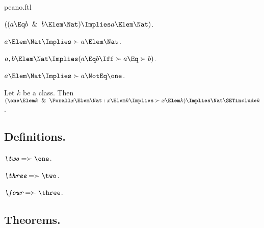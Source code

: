 \documentclass{stex}
\begin{document}
\begin{smodule}{peano.ftl}
\begin{forthel}
  \begin{axiom*}[title=5,name=P5]
    $((a \Eq b \And b \Elem \Nat) \Implies a \Elem \Nat)$.
  \end{axiom*}
  
  \begin{axiom*}[title=6,name=P6]
    $a \Elem \Nat \Implies \succ{a} \Elem \Nat$.
  \end{axiom*}
  
  \begin{axiom*}[title=7,name=P7]
    $a,b \Elem \Nat \Implies (a \Eq b \Iff \succ{a} \Eq \succ{b})$.
  \end{axiom*}
  
  \begin{axiom*}[title=8,name=P8]
    $a \Elem \Nat \Implies \succ{a} \NotEq \one$.
  \end{axiom*}
  
  \begin{axiom*}[title=9,name=P9]
    Let $k$ be a class.
    Then $(\one \Elem k \And \Forall x \Elem \Nat: x \Elem k \Implies \succ{x} \Elem k) \Implies \Nat \SETinclude k$.
  \end{axiom*}
\end{forthel}


\subsection{Definitions.}

\begin{forthel}
  \begin{definition*}[title=10.i,for=two]
    $\emph{\two} = \succ{\one}$.
  \end{definition*}

  \begin{definition*}[title=10.ii,for=three]
    $\emph{\three} = \succ{\two}$.
  \end{definition*}
  
  \begin{definition*}[title=10.iii,for=four]
    $\emph{\four} = \succ{\three}$.
  \end{definition*}
\end{forthel}


\subsection{Theorems.}



\end{smodule}
\end{document}
